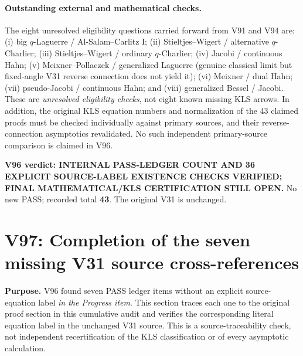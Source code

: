 \documentclass[11pt]{article}
\begin{document}
\paragraph{Outstanding external and mathematical checks.} The eight unresolved eligibility questions carried forward from V91 and V94 are: (i) big $q$-Laguerre / Al-Salam--Carlitz I; (ii) Stieltjes--Wigert / alternative $q$-Charlier; (iii) Stieltjes--Wigert / ordinary $q$-Charlier; (iv) Jacobi / continuous Hahn; (v) Meixner--Pollaczek / generalized Laguerre (genuine classical limit but fixed-angle V31 reverse connection does not yield it); (vi) Meixner / dual Hahn; (vii) pseudo-Jacobi / continuous Hahn; and (viii) generalized Bessel / Jacobi. These are \emph{unresolved eligibility checks}, not eight known missing KLS arrows. In addition, the original KLS equation numbers and normalization of the 43 claimed proofs must be checked individually against primary sources, and their reverse-connection asymptotics revalidated. No such independent primary-source comparison is claimed in V96.

\noindent\textbf{V96 verdict: INTERNAL PASS-LEDGER COUNT AND 36 EXPLICIT SOURCE-LABEL EXISTENCE CHECKS VERIFIED; FINAL MATHEMATICAL/KLS CERTIFICATION STILL OPEN.} No new PASS; recorded total \textbf{43}. The original V31 is unchanged.


\section{V97: Completion of the seven missing V31 source cross-references}
\noindent\textbf{Purpose.} V96 found seven PASS ledger items without an explicit source-equation label \emph{in the Progress item}. This section traces each one to the original proof section in this cumulative audit and verifies the corresponding literal equation label in the unchanged V31 source. This is a source-traceability check, not independent recertification of the KLS classification or of every asymptotic calculation.
\end{document}
